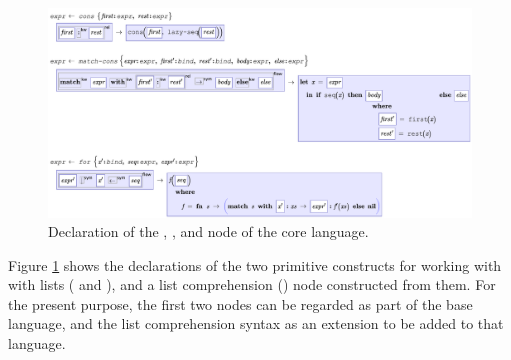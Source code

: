 \begin{figure}[th]
	\centering
	
	\includegraphics[scale=0.35]{src/image/cons.pdf}
	
	\caption{Declaration of the , , and  node of the core language.}
	\label{fig-for-grammar}
\end{figure}

Figure \ref{fig-for-grammar} shows the declarations of the two primitive constructs for working with with lists ( and ), and a list comprehension () node constructed from them. For the present purpose, the first two nodes can be regarded as part of the base language, and the list comprehension syntax as an extension to be added to that language.



